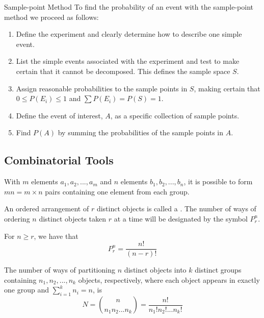\documentclass[12pt, a4paper, twoside, openright, titlepage]{book}
\begin{document}
\begin{defn}{Sample-point Method}{}
    To find the probability of an event with the sample-point method we proceed as follows:\begin{enumerate}
        \item Define the experiment and clearly determine how to describe one simple event.
        \item List the simple events associated with the experiment and test to make certain that it cannot be decomposed. This defines the sample space $S$.
        \item Assign reasonable probabilities to the sample points in $S$, making certain that $0 \leq P(E_i) \leq 1$ and $\sum P(E_i) = P(S) = 1$.
        \item Define the event of interest, $A$, as a specific collection of sample points.
        \item Find $P(A)$ by summing the probabilities of the sample points in $A$.
    \end{enumerate}
\end{defn}


\subsection{\textsection Combinatorial Tools}

\begin{thm}{}{}
    With $m$ elements $a_1,a_2,...,a_m$ and $n$ elements $b_1,b_2,...,b_n$, it is possible to form $mn = m\times n$ pairs containing one element from each group.
\end{thm}

\begin{defn}{}{}
    An ordered arrangement of $r$ distinct objects is called a . The number of ways of ordering $n$ distinct objects taken $r$ at a time will be designated by the symbol $P_r^n$.
\end{defn}

\begin{thm}{}{}
    For $n \geq r$, we have that \begin{equation}
        P_r^n = \frac{n!}{(n-r)!}
    \end{equation}
\end{thm}


\begin{thm}{}{}
    The number of ways of partitioning $n$ distinct objects into $k$ distinct groups containing $n_1,n_2,...,n_k$ objects, respectively, where each object appears in exactly one group and $\sum_{i=1}^kn_i = n$, is\begin{equation}
        N = \binom{n}{n_1n_2...n_k} = \frac{n!}{n_1!n_2!...n_k!}
    \end{equation}
\end{thm}
\end{document}
